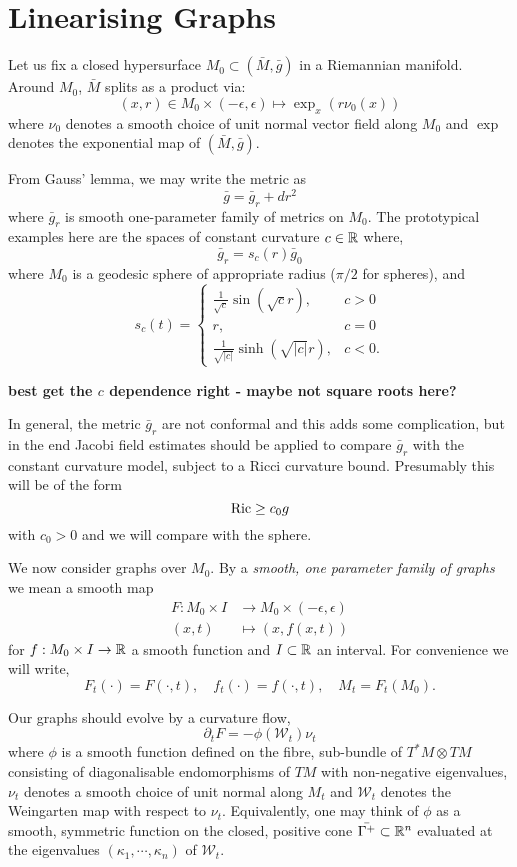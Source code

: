 \documentclass{amsart}
\begin{document}
\section{Linearising Graphs}
\label{sec:linearising_graphs}

Let us fix a closed hypersurface \(M_0 \subset (\bar{M}, \bar{g})\) in a Riemannian manifold. Around \(M_0\), \(\bar{M}\) splits as a product via:
\[
(x, r) \in M_0 \times (-\epsilon, \epsilon) \mapsto \exp_x(r \nu_0(x))
\]
where \(\nu_0\) denotes a smooth choice of unit normal vector field along \(M_0\) and \(\exp\) denotes the exponential map of \((\bar{M}, \bar{g})\).

From Gauss' lemma, we may write the metric as
\[
\bar{g} = \bar{g}_r + dr^2
\]
where \(\bar{g}_r\) is smooth one-parameter family of metrics on \(M_0\). The prototypical examples here are the spaces of constant curvature \(c \in \mathbb{R}\) where,
\[
\bar{g}_r = s_c (r) \bar{g}_0
\]
where \(M_0\) is a geodesic sphere of appropriate radius (\(\pi/2\) for spheres), and
\[
s_c(t) = \begin{cases}
\frac{1}{\sqrt{c}} \sin(\sqrt{c} r), & c > 0 \\
r, & c = 0 \\
\frac{1}{\sqrt{|c|}} \sinh(\sqrt{|c|} r), & c < 0.
\end{cases}
\]

\textbf{best get the \(c\) dependence right - maybe not square roots here?}

In general, the metric \(\bar{g}_r\) are not conformal and this adds some complication, but in the end Jacobi field estimates should be applied to compare \(\bar{g}_r\) with the constant curvature model, subject to a Ricci curvature bound. Presumably this will be of the form
\[
\operatorname{Ric} \geq c_0 g
\]
with \(c_0 > 0\) and we will compare with the sphere.

We now consider graphs over \(M_0\). By a \emph{smooth, one parameter family of graphs} we mean a smooth map
\begin{align*}
F : M_0 \times I &\to M_0 \times (-\epsilon, \epsilon) \\
(x, t) &\mapsto (x, f(x, t))
\end{align*}
for \(f : M_0 \times I \to \mathbb{R}\) a smooth function and \(I \subset \mathbb{R}\) an interval. For convenience we will write,
\[
F_t (\cdot) = F(\cdot, t), \quad f_t(\cdot) = f(\cdot, t), \quad M_t = F_t(M_0).
\]

Our graphs should evolve by a curvature flow,
\[
\partial_t F = -\phi(\mathcal{W}_t) \nu_t
\]
where \(\phi\) is a smooth function defined on the fibre, sub-bundle of \(T^{\ast} M \otimes TM\) consisting of diagonalisable endomorphisms of \(TM\) with non-negative eigenvalues, \(\nu_t\) denotes a smooth choice of unit normal along \(M_t\) and \(\mathcal{W}_t\) denotes the Weingarten map with respect to \(\nu_t\). Equivalently, one may think of \(\phi\) as a smooth, symmetric function on the closed, positive cone \(\bar{\Gamma^+} \subset \mathbb{R}^n\) evaluated at the eigenvalues \((\kappa_1,\cdots, \kappa_n)\) of \(\mathcal{W}_t\).
\end{document}
